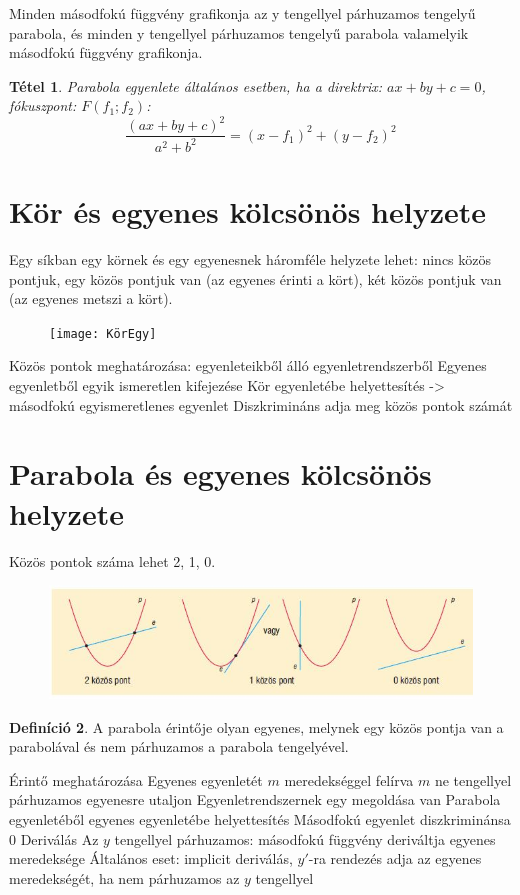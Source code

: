 \documentclass[twoside,12pt]{report}
\newtheorem{theorem}{Tétel}[section]
\theoremstyle{definition}
\newtheorem{definition}[theorem]{Definíció}
\begin{document}
	Minden másodfokú függvény grafikonja az y tengellyel párhuzamos tengelyű parabola, és minden y tengellyel párhuzamos tengelyű parabola valamelyik másodfokú függvény grafikonja.
	\begin{theorem}
		Parabola egyenlete általános esetben, ha a direktrix: $ax+by+c=0$, fókuszpont: $F(f_1;f_2)$:
		\begin{equation*}
		\frac{(ax+by+c)^2}{a^2+b^2}=(x-f_1)^2+(y-f_2)^2
		\end{equation*}
	\end{theorem}
\section{Kör és egyenes kölcsönös helyzete}
	Egy síkban egy körnek és egy egyenesnek háromféle helyzete lehet: nincs közös pontjuk, egy közös pontjuk van (az egyenes érinti a kört), két közös pontjuk van (az egyenes metszi a kört).
	\begin{figure}[H]
		\centering
		\texttt{[image: KörEgy]}
	\end{figure}
	\begin{outline}
		\1 Közös pontok meghatározása: egyenleteikből álló egyenletrendszerből
			\2 Egyenes egyenletből egyik ismeretlen kifejezése
			\2 Kör egyenletébe helyettesítés -> másodfokú egyismeretlenes egyenlet
			\2 Diszkrimináns adja meg közös pontok számát
	\end{outline}
\section{Parabola és egyenes kölcsönös helyzete}
	Közös pontok száma lehet 2, 1, 0.
	\begin{figure}[H]
		\centering
		\includegraphics[width=\linewidth]{ParEgye}
	\end{figure}
	\begin{definition}
		A parabola érintője olyan egyenes, melynek egy közös pontja van a parabolával és
		nem párhuzamos a parabola tengelyével.
	\end{definition}
	\begin{outline}
		\1 Érintő meghatározása
			\2 Egyenes egyenletét $m$ meredekséggel felírva
				\3 $m$ ne tengellyel párhuzamos egyenesre utaljon
			\2 Egyenletrendszernek egy megoldása van
			\2 Parabola egyenletéből egyenes egyenletébe helyettesítés
				\3 Másodfokú egyenlet diszkriminánsa 0
		\1 Deriválás
			\2 Az $y$ tengellyel párhuzamos: másodfokú függvény deriváltja egyenes meredeksége
			\2 Általános eset: implicit deriválás, $y'$-ra rendezés adja az egyenes meredekségét, ha nem párhuzamos az $y$ tengellyel
	\end{outline}
\end{document}
